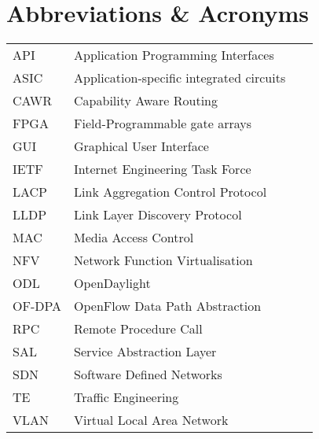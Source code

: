 \chapter*{Abbreviations \& Acronyms}
\begin{flushleft}
\begin{tabular}{l p{0.8\linewidth}}
API       & Application Programming Interfaces\\
ASIC      & Application-specific integrated circuits\\
CAWR      & Capability Aware Routing\\
FPGA      & Field-Programmable gate arrays\\
GUI       & Graphical User Interface\\
IETF      & Internet Engineering Task Force\\
LACP      & Link Aggregation Control Protocol\\
LLDP      & Link Layer Discovery Protocol\\
MAC       & Media Access Control\\
NFV       & Network Function Virtualisation\\
ODL       & OpenDaylight\\
OF-DPA    & OpenFlow Data Path Abstraction\\
RPC       & Remote Procedure Call\\
SAL       & Service Abstraction Layer\\
SDN       & Software Defined Networks\\
TE        & Traffic Engineering\\
VLAN      & Virtual Local Area Network\\
\end{tabular}
\end{flushleft}


